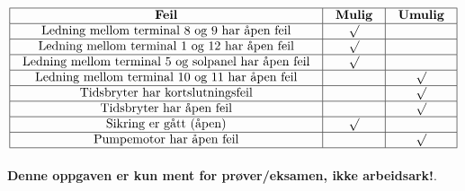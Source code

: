 $$\vbox{\offinterlineskip
\halign{\strut
\vrule \quad\hfil # \ \hfil & 
\vrule \quad\hfil # \ \hfil & 
\vrule \quad\hfil # \ \hfil \vrule \cr
\noalign{\hrule}
%
{\bf Feil} & {\bf Mulig} & {\bf Umulig} \cr
%
\noalign{\hrule}
%
Ledning mellom terminal 8 og 9 har åpen feil & $\surd$ &  \cr
%
\noalign{\hrule}
%
Ledning mellom terminal 1 og 12 har åpen feil & $\surd$ &  \cr
%
\noalign{\hrule}
%
Ledning mellom terminal 5 og solpanel har åpen feil & $\surd$ &  \cr
%
\noalign{\hrule}
%
Ledning mellom terminal 10 og 11 har åpen feil &  & $\surd$ \cr
%
\noalign{\hrule}
%
Tidsbryter har kortslutningsfeil &  & $\surd$ \cr
%
\noalign{\hrule}
%
Tidsbryter har åpen feil &  & $\surd$ \cr
%
\noalign{\hrule}
%
Sikring er gått (åpen) & $\surd$ &  \cr
%
\noalign{\hrule}
%
Pumpemotor har åpen feil &  & $\surd$ \cr
%
\noalign{\hrule}
} %
}$$ %








{\bf Denne oppgaven er kun ment for prøver/eksamen, ikke arbeidsark!}.



